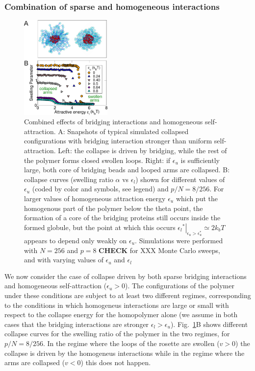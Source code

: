 \documentclass[
preprint,
a4paper,
12pt,
superscriptaddress,
pre]{revtex4}
\begin{document}
\subsubsection*{Combination of sparse and homogeneous interactions} 

\begin{figure}
  \centering
  \includegraphics[width=0.4\textwidth]{fig4}
  \caption{Combined effects of bridging interactions and
      homogeneous self-attraction.  A: Snapshots of  typical simulated
      collapsed configurations with bridging interaction stronger than
      uniform self-attraction. Left: the collapse is driven
      by bridging,  while the rest of the polymer forms closed swollen
      loops. Right: if $\epsilon_u$ is sufficiently large, both core
      of bridging beads and looped arms are collapsed. 
    B: collapse curves (swelling ratio $\alpha$ vs $\epsilon_l$) shown for
    different values of $\epsilon_u$ (coded by color and symbols, see
    legend) and $p/N = 8/256$.
%
    For larger values of homogeneous attraction energy $\epsilon_u$
    which put the homogenous part of the polymer below the theta
    point, the formation of a core  of the bridging proteins still occurs inside
    the formed globule, but the point at which this  occurs
    $\left.{\epsilon_l}^*\right|_{\epsilon_u > \epsilon_u^*} \simeq 2k_bT$
    appears to depend only weakly on $\epsilon_u$.
%
    Simulations were  performed with $N=256$ and $p=8$
    \textbf{CHECK} for XXX Monte Carlo sweeps, and with varying values
    of $\epsilon_u$ and $\epsilon_l$ }
  \label{fig:4}
\end{figure}

We now consider the case of collapse driven by both sparse bridging
interactions and homogeneous self-attraction ($\epsilon_u > 0$).  The
configurations of the polymer under these conditions are subject to at
least two different regimes, corresponding to the conditions in which
homogeneus interactions are large or small with respect to the
collapse energy for the homopolymer alone (we assume in both cases
that the bridging interactions are stronger $\epsilon_l >
\epsilon_u$).
Fig.~\ref{fig:4}B shows different collapse curves for the swelling
ratio of the polymer in the two regimes, for $p/N = 8/256$. In the
regime where the loops of the rosette are swollen ($v  > 0$)
the collapse is driven by the homogeneus interactions while in the
regime where the arms are collapsed ($v  < 0$) this does not
happen. 
%
\end{document}
